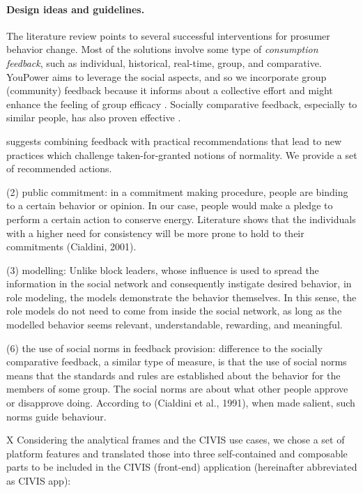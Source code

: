 \paragraph{Design ideas and guidelines.} The literature review points to several successful interventions for prosumer behavior change. Most of the solutions involve some type of \textit{consumption feedback}, such as individual, historical, real-time, group, and comparative.  YouPower aims to leverage the social aspects, and so we incorporate group (community) feedback because it informs about a collective effort and might enhance the feeling of group efficacy \cite{bandura1997self}. Socially comparative feedback, especially to similar people, has also proven effective \cite{allcott2011social,cialdini2001harnessing,petkov2011motivating}. 


\cite{strengers2011designing} suggests combining feedback with practical recommendations that lead to new practices which challenge taken-for-granted notions of normality. We provide a set of recommended actions.

(2) public commitment: in a commitment making procedure, people are binding to a certain behavior or opinion. In our case, people would make a pledge to perform a certain action to conserve energy. Literature shows that the individuals with a higher need for consistency will be more prone to hold to their commitments (Cialdini, 2001).


(3) modelling: Unlike block leaders, whose influence is used to spread the information in the social network and consequently instigate desired behavior, in role modeling, the models demonstrate the behavior themselves. In this sense, the role models do not need to come from inside the social network, as long as the modelled behavior seems relevant, understandable, rewarding, and meaningful.


(6) the use of social norms in feedback provision: difference to the socially comparative feedback, a similar type of measure, is that the use of social norms means that the standards and rules are established about the behavior for the members of some group. The social norms are about what other people approve or disapprove doing. According to (Cialdini et al., 1991), when made salient, such norms guide behaviour.


X Considering the analytical frames and the CIVIS use cases, we chose a set of platform features and translated those into three self-contained and composable parts to be included in the CIVIS (front-end) application (hereinafter abbreviated as CIVIS app): 



